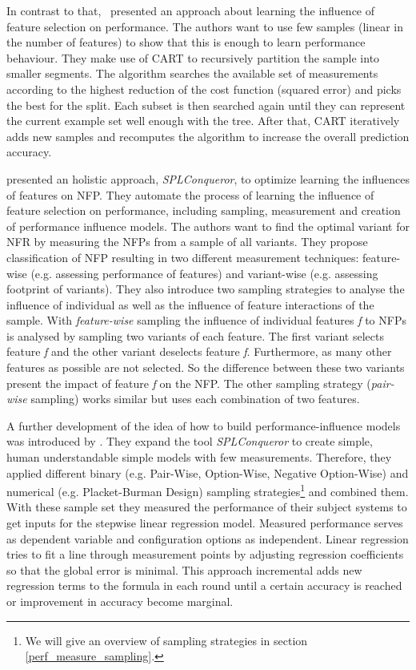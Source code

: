 In contrast to that,~\cite{guo2013variability} presented an approach about learning the influence of feature selection on performance. The authors want to use few samples (linear in the number of features) to show that this is enough to learn performance behaviour. They make use of \ac{CART} to recursively partition the sample into smaller segments. The algorithm searches the available set of measurements according to the highest reduction of the cost function (squared error) and picks the best for the split. Each subset is then searched again until they can represent the current example set well enough with the tree. After that, \ac{CART} iteratively adds new samples and recomputes the algorithm to increase the overall prediction accuracy.

\cite{siegmund2012spl} presented an holistic approach, \textit{SPLConqueror}, to optimize learning the influences of features on \ac{NFP}. They automate the process of learning the influence of feature selection on performance, including sampling, measurement and creation of performance influence models. The authors want to find the optimal variant for \ac{NFR} by measuring the \acp{NFP} from a sample of all variants. They propose classification of \ac{NFP} resulting in two different measurement techniques: feature-wise (e.g. assessing performance of features) and variant-wise (e.g. assessing footprint of variants). They also introduce two sampling strategies to analyse the influence of individual as well as the influence of feature interactions of the sample. With \textit{feature-wise} sampling the influence of individual features \textit{f} to \acp{NFP} is analysed by sampling two variants of each feature. The first variant selects feature \textit{f} and the other variant deselects feature \textit{f}. Furthermore, as many other features as possible are not selected. So the difference between these two variants present the impact of feature \textit{f} on the \ac{NFP}. The other sampling strategy (\textit{pair-wise} sampling) works similar but uses each combination of two features.

A further development of the idea of how to build performance-influence models was introduced by \cite{siegmund2015performance}. They expand the tool \textit{SPLConqueror} to create simple, human understandable simple models with few measurements. Therefore, they applied different binary (e.g. Pair-Wise, Option-Wise, Negative Option-Wise) and numerical (e.g. Placket-Burman Design) sampling strategies\footnote{We will give an overview of sampling strategies in section \ref{perf_measure_sampling}.} and combined them. With these sample set they measured the performance of their subject systems to get inputs for the stepwise linear regression model. Measured performance serves as dependent variable and configuration options as independent. Linear regression tries to fit a line through measurement points by adjusting regression coefficients so that the global error is minimal. This approach incremental adds new regression terms to the formula in each round until a certain accuracy is reached or improvement in accuracy become marginal.

